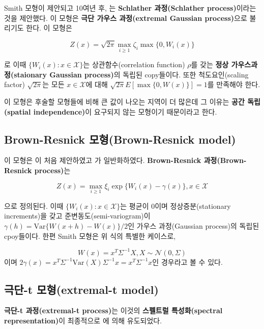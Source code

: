 \documentclass[b5paper,]{scrbook}
\theoremstyle{plain}
\theoremstyle{definition}
\numberwithin{equation}{section}
\begin{document}
Smith 모형이 제안되고 10여년 후, \citep{Schlather2002}는
\textbf{Schlather 과정(Schlather process)}이라는 것을 제안했다. 이
모형은 \textbf{극단 가우스 과정(extremal Gaussian process)}으로 불리기도
한다. 이 모형은

\begin{equation}
Z(x)=\sqrt{2\pi}\max_{i\geq 1}\zeta_{i}\max\{0,W_{i}(x)\}
\end{equation}

로 이때 \(\{W_{i}(x): x\in\mathcal{X}\}\)는 상관함수(correlation
function) \(\rho\)를 갖는 \textbf{정상 가우스과정(staionary Gaussian
process)}의 독립된 copy들이다. 또한 척도요인(scaling factor)
\(\sqrt{2\pi}\)는 모든 \(x\in\mathcal{X}\)에 대해
\(\sqrt{2\pi}E[\max\{ 0,W(x)\}]=1\)를 만족해야 한다.

이 모형은 후술할 모형들에 비해 큰 값이 나오는 지역이 더 많은데 그 이유는
\textbf{공간 독립(spatial independence)}이 요구되지 않는 모형이기
때문이라고 한다.

\subsection{Brown-Resnick 모형(Brown-Resnick
model)}\label{brown-resnick-brown-resnick-model}

이 모형은 \citep{Brown1977}이 처음 제안하였고 \citep{Kabluchko2009a}가
일반화하였다. \textbf{Brown-Resnick 과정(Brown-Resnick process)}는

\begin{equation}
Z(x)=\max_{i\geq 1}\xi_{i}\exp\{W_{i}(x)-\gamma(x)\},x\in\mathcal{X}
\end{equation}

으로 정의된다. 이때 \(\{W_{i}(x): x\in\mathcal{X}\}\)는 평균이 0이며
정상증분(stationary increments)을 갖고 준변동도(semi-variogram)이
\(\gamma(h)=\text{Var}\{W(x+h)-W(x)\}/2\)인 가우스 과정(Gaussian
process)의 독립된 cpoy들이다. 한편 Smith 모형은 위 식의 특별한 케이스로,

\[W(x)=x^{T}\Sigma^{-1}X, X\sim\mathcal{N}(0,\Sigma)\] 이며
\(2\gamma(x)=x^{T}\Sigma^{-1}\text{Var}(X)\Sigma^{-1}x=x^{T}\Sigma^{-1}x\)인
경우라고 볼 수 있다.

\subsection{극단-t 모형(extremal-t model)}\label{-t-extremal-t-model}

\textbf{극단-t 과정(extremal-t process)}는 이것의 \textbf{스펠트럴
특성화(spectral representation)}이 최종적으로 \citep{Opitz2013}에 의해
유도되었다.
\end{document}
